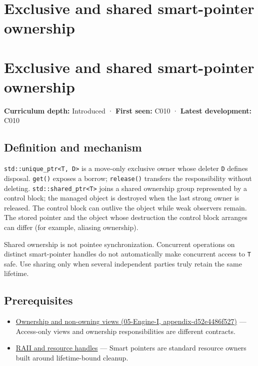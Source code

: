 \hypertarget{appendix-51602cabe815}{}
\section*{Exclusive and shared smart-pointer ownership}
\section{Exclusive and shared smart-pointer ownership}\label{appendix-51602cabe815-exclusive-and-shared-smart-pointer-ownership}

\textbf{Curriculum depth:} Introduced · \textbf{First seen:} C010 · \textbf{Latest development:} C010

\subsection{Definition and mechanism}\label{appendix-51602cabe815-definition-and-mechanism}

\texttt{std::unique\_ptr\textless{}T,\ D\textgreater{}} is a move-only exclusive owner whose deleter \texttt{D} defines disposal. \texttt{get()} exposes a borrow; \texttt{release()} transfers the responsibility without deleting. \texttt{std::shared\_ptr\textless{}T\textgreater{}} joins a shared ownership group represented by a control block; the managed object is destroyed when the last strong owner is released. The control block can outlive the object while weak observers remain. The stored pointer and the object whose destruction the control block arranges can differ (for example, aliasing ownership).

Shared ownership is not pointee synchronization. Concurrent operations on distinct smart-pointer handles do not automatically make concurrent access to \texttt{T} safe. Use sharing only when several independent parties truly retain the same lifetime.

\subsection{Prerequisites}\label{appendix-51602cabe815-prerequisites}

\begin{itemize}
\tightlist
\item
  \href{../05-Engine-I/main.pdf\#nameddest=appendix-d52e4486f527}{Ownership and non-owning views (05-Engine-I, appendix-d52e4486f527)} --- Access-only views and ownership responsibilities are different contracts.
\item
  \hyperref[appendix-69739d3ab49b]{RAII and resource handles} --- Smart pointers are standard resource owners built around lifetime-bound cleanup.
\end{itemize}

